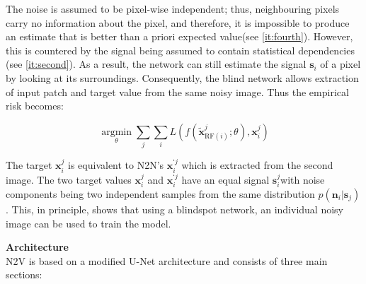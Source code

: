 The noise is assumed to be pixel-wise independent; thus, neighbouring pixels carry no information about the pixel, and therefore, it is impossible to produce an estimate that is better than a priori expected value(see \ref{it:fourth}). However, this is countered by the signal being assumed to contain statistical dependencies (see \ref{it:second}). As a result, the network can still estimate the signal ${{\mathbf{s}}_i}$ of a pixel by looking at its surroundings.  Consequently, the blind network allows extraction of input patch and target value from the same noisy image. Thus the empirical risk becomes:

\begin{equation}
	\mathop {\arg \min }\limits_\theta \sum\limits_j {\sum\limits_i {L\left( {f({\mathbf{\tilde x}}_{{\text{RF}}(i)}^j;\theta ),{\mathbf{x}}_i^j} \right)} } 
	 \label{eq:minn2v}
\end{equation}

The target ${\mathbf{x}}_i^j$ is equivalent to \gls{N2N}'s ${\mathbf{x}}_i^{‘j}$ which is extracted from the second image. The two target values ${\mathbf{x}}_i^j$ and ${{\mathbf{x}}_i^{‘j}}$ have an equal signal ${{\mathbf{s}}_i^j}$with noise components being two independent samples from the same distribution $p({{\mathbf{n}}_i}|{{\mathbf{s}}_j})$. This, in principle, shows that using a blindspot network, an individual noisy image can be used to train the model. 

\textbf{Architecture}\\
\gls{N2V} is  based on a modified \gls{U-Net} architecture and consists of three main sections:

